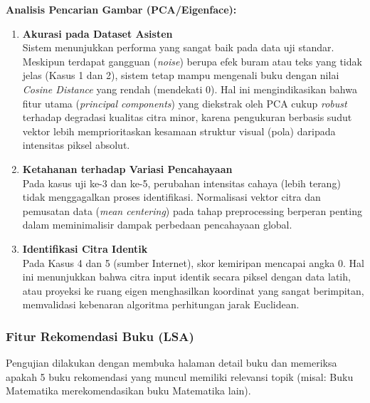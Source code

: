 \documentclass[12pt,a4paper]{article}
\begin{document}
\textbf{Analisis Pencarian Gambar (PCA/Eigenface):}
\begin{enumerate}[label=\textbf{\arabic*.}]
    \item \textbf{Akurasi pada Dataset Asisten} \\
    Sistem menunjukkan performa yang sangat baik pada data uji standar. Meskipun terdapat gangguan (\textit{noise}) berupa efek buram atau teks yang tidak jelas (Kasus 1 dan 2), sistem tetap mampu mengenali buku dengan nilai \textit{Cosine Distance} yang rendah (mendekati 0). Hal ini mengindikasikan bahwa fitur utama (\textit{principal components}) yang diekstrak oleh PCA cukup \textit{robust} terhadap degradasi kualitas citra minor, karena pengukuran berbasis sudut vektor lebih memprioritaskan kesamaan struktur visual (pola) daripada intensitas piksel absolut.

    \item \textbf{Ketahanan terhadap Variasi Pencahayaan} \\
    Pada kasus uji ke-3 dan ke-5, perubahan intensitas cahaya (lebih terang) tidak menggagalkan proses identifikasi. Normalisasi vektor citra dan pemusatan data (\textit{mean centering}) pada tahap preprocessing berperan penting dalam meminimalisir dampak perbedaan pencahayaan global.

    \item \textbf{Identifikasi Citra Identik} \\
    Pada Kasus 4 dan 5 (sumber Internet), skor kemiripan mencapai angka 0. Hal ini menunjukkan bahwa citra input identik secara piksel dengan data latih, atau proyeksi ke ruang eigen menghasilkan koordinat yang sangat berimpitan, memvalidasi kebenaran algoritma perhitungan jarak Euclidean.
\end{enumerate}
\newpage
\subsubsection{Fitur Rekomendasi Buku (LSA)}
Pengujian dilakukan dengan membuka halaman detail buku dan memeriksa apakah 5 buku rekomendasi yang muncul memiliki relevansi topik (misal: Buku Matematika merekomendasikan buku Matematika lain).
\end{document}
